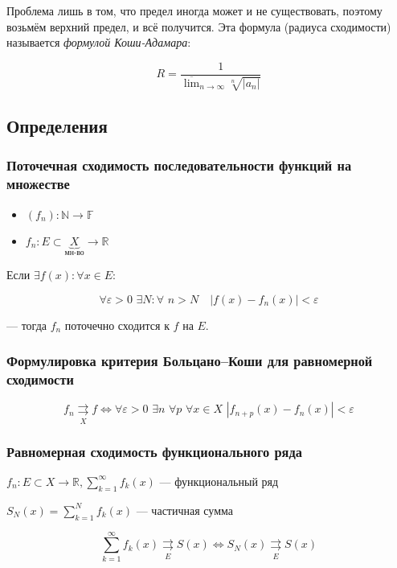 \documentclass{article}
\def\dbl{\,\,}
\def\rsh#1{\underset{#1}{\rightrightarrows}}
\def\rshe{\rsh{E}}
\begin{document}
Проблема лишь в том, что предел иногда может и не существовать, поэтому возьмём верхний предел, и всё получится. Эта формула (радиуса сходимости) называется \textit{формулой Коши-Адамара}:

\[R = \frac{1}{ \overline{\lim}_{n \rightarrow \infty}\sqrt[n]{|a_n|}}\]

\newpage

\subsection{Определения}

\subsubsection{Поточечная сходимость последовательности функций на множестве}

\begin{itemize}
    \item $(f_n): \mathbb{N} \rightarrow \mathbb{F}$
    \item $f_n: E \subset \underbrace{X}_{\text{мн-во}} \rightarrow \mathbb{R}$
\end{itemize}

Если $\exists f(x): \forall x \in E$:

\[\forall \varepsilon > 0 \dbl \exists N: \forall \dbl n > N \quad |f(x) - f_n(x)| < \varepsilon\]

--- тогда $f_n$ поточечно сходится к $f$ на $E$.

\subsubsection{Формулировка критерия Больцано--Коши для равномерной сходимости}

\[f_n \rsh{X} f \Leftrightarrow \forall \varepsilon > 0 \dbl \exists n \dbl \forall p \dbl \forall x \in X \dbl \left|f_{n + p}(x) - f_n(x)\right| < \varepsilon \]

\subsubsection{Равномерная сходимость функционального ряда}

$f_n: E \subset X \rightarrow \mathbb{R}, \sum_{k = 1}^{\infty} f_k(x)$ --- функциональный ряд

$S_N(x) = \sum_{k = 1}^N f_k(x)$ --- частичная сумма

\[\sum_{k = 1}^{\infty} f_k(x) \rsh{E} S(x) \Leftrightarrow S_N(x) \rshe S(x)\]
\end{document}
